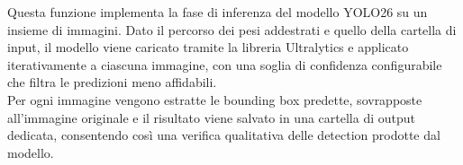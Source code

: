 \vspace{0.5cm}
\noindent
Questa funzione implementa la fase di inferenza del modello YOLO26 su un insieme di immagini. Dato il percorso dei pesi addestrati e quello della cartella di input, il modello viene caricato tramite la libreria Ultralytics e applicato iterativamente a ciascuna immagine, con una soglia di confidenza configurabile che filtra le predizioni meno affidabili. \\
\noindent
Per ogni immagine vengono estratte le bounding box predette, sovrapposte all'immagine originale e il risultato viene salvato in una cartella di output dedicata, consentendo così una verifica qualitativa delle detection prodotte dal modello.
